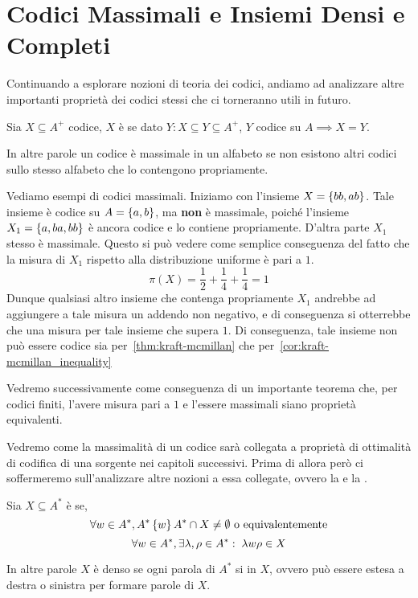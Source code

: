\section{Codici Massimali e Insiemi Densi e Completi}

Continuando a esplorare nozioni di teoria dei codici, andiamo ad analizzare altre importanti proprietà dei codici stessi che ci torneranno utili in futuro.

\begin{definition}
  Sia \(X \subseteq A^+\) codice, \(X\) è  se dato \(Y: X\subseteq Y \subseteq A^+\), \(Y\) codice su \(A \implies X = Y\).

  In altre parole un codice è massimale in un alfabeto se non esistono altri codici sullo stesso alfabeto che lo contengono propriamente.
\end{definition}

\begin{example}
  Vediamo esempi di codici massimali.
  Iniziamo con l'insieme \(X = \set{bb,ab}\). Tale insieme è codice su \(A = \set{a,b}\), ma \textbf{non} è massimale, poiché l'insieme \(X_1 = \set{a,ba,bb}\) è ancora codice e lo contiene propriamente.
  D'altra parte \(X_1\) stesso è massimale. Questo si può vedere come semplice conseguenza del fatto che la misura di \(X_1\) rispetto alla distribuzione uniforme è pari a \(1\).
  \[\pi(X) = \frac{1}{2} + \frac{1}{4} + \frac{1}{4} = 1\]
  Dunque qualsiasi altro insieme che contenga propriamente \(X_1\) andrebbe ad aggiungere a tale misura un addendo non negativo, e di conseguenza si otterrebbe che una misura per tale insieme che supera \(1\).
  Di conseguenza, tale insieme non può essere codice sia per~\ref{thm:kraft-mcmillan} che per~\ref{cor:kraft-mcmillan_inequality}

  Vedremo successivamente come conseguenza di un importante teorema che, per codici finiti, l'avere misura pari a \(1\) e l'essere massimali siano proprietà equivalenti.
\end{example}

Vedremo come la massimalità di un codice sarà collegata a proprietà di ottimalità di codifica di una sorgente nei capitoli successivi.
Prima di allora però ci soffermeremo sull'analizzare altre nozioni a essa collegate, ovvero la  e la .

\begin{definition}
  Sia \(X \subseteq A^*\) è  se, 
  \[\forall w \in A^*,A^*\set{w}A^* \cap X \neq \emptyset \text{ o equivalentemente}\]
  \[\forall w \in A^*, \exists \lambda,\rho\in A^* :\; \lambda w \rho \in X\]

  In altre parole \(X\) è denso se ogni parola di \(A^*\) si  in \(X\), ovvero può essere estesa a destra o sinistra per formare parole di \(X\).
\end{definition}

